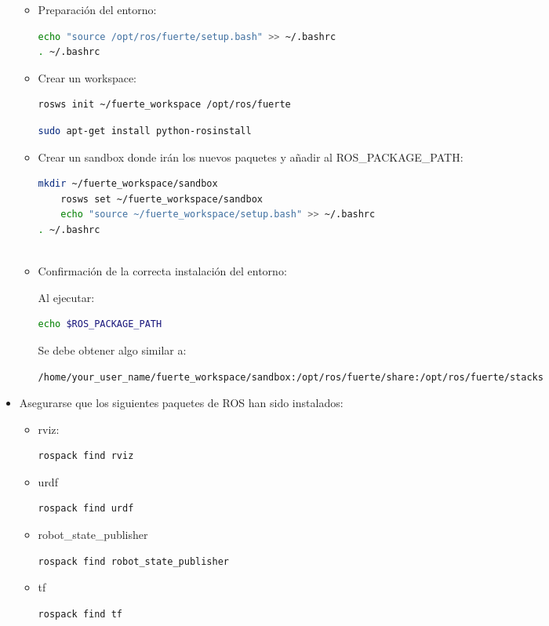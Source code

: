 \documentclass[12pt,a4paper,final,twoside]{book}
\begin{document}
\begin{itemize}
\begin{itemize}
\item Preparación del entorno:
\begin{lstlisting}[language=bash]
	echo "source /opt/ros/fuerte/setup.bash" >> ~/.bashrc
. ~/.bashrc
\end{lstlisting}

\item Crear un workspace:
\begin{lstlisting}[language=bash]
	rosws init ~/fuerte_workspace /opt/ros/fuerte
\end{lstlisting}
\begin{lstlisting}[language=bash]
	sudo apt-get install python-rosinstall
\end{lstlisting}
\item Crear un sandbox donde irán los nuevos paquetes y añadir al ROS{\_}PACKAGE{\_}PATH:
\begin{lstlisting}[language=bash]
	mkdir ~/fuerte_workspace/sandbox
	rosws set ~/fuerte_workspace/sandbox
	echo "source ~/fuerte_workspace/setup.bash" >> ~/.bashrc
. ~/.bashrc
	
\end{lstlisting}
\item Confirmación de la correcta instalación del entorno:

Al ejecutar:
\begin{lstlisting}[language=bash]
	echo $ROS_PACKAGE_PATH
\end{lstlisting}
Se debe obtener algo similar a:
\begin{lstlisting}[language=bash]
	/home/your_user_name/fuerte_workspace/sandbox:/opt/ros/fuerte/share:/opt/ros/fuerte/stacks
\end{lstlisting}
\end{itemize}

\item Asegurarse que los siguientes paquetes de ROS han sido instalados:
\begin{itemize}
\item rviz:
\begin{lstlisting}[language=bash]
	rospack find rviz
\end{lstlisting}
\item urdf
\begin{lstlisting}[language=bash]
	rospack find urdf
\end{lstlisting}
\item robot{\_}state{\_}publisher
\begin{lstlisting}[language=bash]
	rospack find robot_state_publisher
\end{lstlisting}
\item tf
\begin{lstlisting}[language=bash]
	rospack find tf
\end{lstlisting}



\end{itemize}
\end{itemize}
\end{document}
